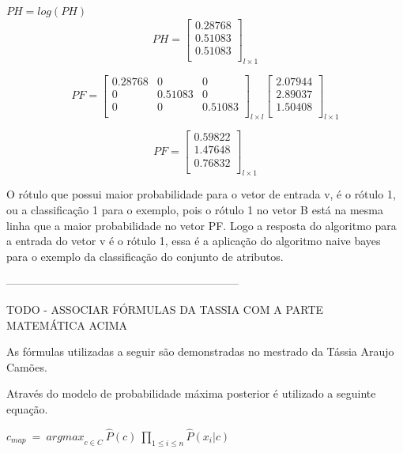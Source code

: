 \begin{center}
$PH = log(PH)$
$$PH=\left[
\begin{array}{c}
0.28768 \\
0.51083 \\
0.51083 \\
\end{array}
\right]_{l \times 1}$$
\end{center}

$$PF=\left[
\begin{array}{ccccc}
0.28768 & 0 & 0 \\
0 & 0.51083 & 0 \\
0 & 0 & 0.51083 \\
\end{array}
\right]_{l \times l}
\left[
\begin{array}{c}
2.07944 \\
2.89037 \\
1.50408 \\
\end{array}
\right]_{l \times 1}
$$

$$PF=\left[
\begin{array}{c}
0.59822 \\
1.47648 \\
0.76832 \\
\end{array}
\right]_{l \times 1}
$$

O rótulo que possui maior probabilidade para o vetor de entrada v, é
o rótulo 1, ou a classificação 1 para o exemplo, pois o rótulo 1 no
vetor B está na mesma linha que a maior probabilidade no vetor PF.
Logo a resposta do algoritmo para a entrada do vetor v é o rótulo 1,
essa é a aplicação do algoritmo naive bayes para o exemplo da classificação
do conjunto de atributos.




---------------------------------------------------------------

TODO - ASSOCIAR FÓRMULAS DA TASSIA COM A PARTE MATEMÁTICA ACIMA

As fórmulas utilizadas a seguir são demonstradas no mestrado da Tássia Araujo Camões.

Através do modelo de probabilidade máxima posterior é utilizado a seguinte equação.

\begin{center}

$ c_{map} \ = \ {arg max}_{c \in C} \ \hat{P}(c) \ \prod\limits_{1 \leq i \leq n} \hat{P}(x_i | c)  $
\\
\end{center}

